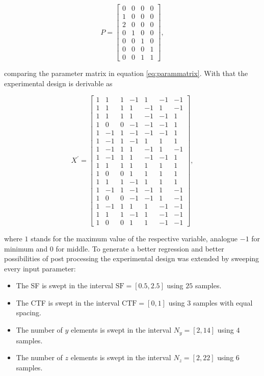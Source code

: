 \begin{equation}
P = \begin{bmatrix}
0 & 0 & 0 & 0\\
1 & 0 & 0 & 0\\
2 & 0 & 0 & 0\\
0 & 1 & 0 & 0\\
0 & 0 & 1 & 0\\
0 & 0 & 0 & 1\\
0 & 0 & 1 & 1
\end{bmatrix},
\end{equation}

comparing the parameter matrix in equation \ref{eq:parammatrix}. With that the experimental design is derivable as 

\begin{equation}
X^\prime = \begin{bmatrix}
1&1&1&-1&1&-1&-1\\
1&1&1&1&-1&1&-1\\
1&1&1&1&-1&-1&1\\
1&0&0&-1&-1&-1&1\\
1&-1&1&-1&-1&-1&1\\
1&-1&1&-1&1&1&1\\
1&-1&1&1&-1&1&-1\\
1&-1&1&1&-1&-1&1\\
1&1&1&1&1&1&1\\
1&0&0&1&1&1&1\\
1&1&1&-1&1&1&1\\
1&-1&1&-1&-1&1&-1\\
1&0&0&-1&-1&1&-1\\
1&-1&1&1&1&-1&-1\\
1&1&1&-1&1&-1&-1\\
1&0&0&1&1&-1&-1
\end{bmatrix},
\end{equation}

where $1$ stands for the maximum value of the respective variable, analogue $-1$ for minimum and $0$ for middle. To generate a better regression and better possibilities of post processing the experimental design was extended by sweeping every input parameter:

\begin{itemize}
\item The \ac{SF} is swept in the interval $\text{SF}=\left[0.5,2.5\right]$ using $25$ samples.
\item The \ac{CTF} is swept in the interval $\text{CTF}=\left[0,1\right]$ using $3$ samples with equal spacing.
\item The number of $y$ elements is swept in the interval $N_y=\left[2,14\right]$ using $4$ samples.
\item The number of $z$ elements is swept in the interval $N_z=\left[2,22\right]$ using $6$ samples.
\end{itemize}


